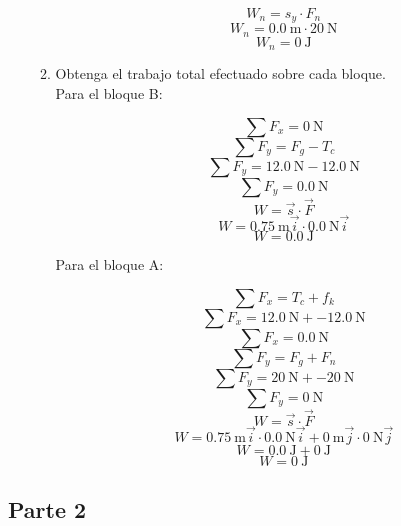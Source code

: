 \documentclass[Física - Práctica.root.tex]{subfiles}
\begin{document}
\begin{enumerate}
\begin{enumerate}
\begin{center}
                  \[ W_n = s_y\cdot F_n \]
                  \[ W_n = \SI{0,0}{\meter}\cdot\SI{20}{\newton} \]
                  \[ \boxed{W_n = \SI{0}{\joule}} \]
                \end{center}
          \item Obtenga el trabajo total efectuado sobre cada bloque. \\
                Para el bloque B:
                \begin{center}
                  \[ \sum F_x = \SI{0}{\newton} \]
                  \[ \sum F_y = F_g - T_c \]
                  \[ \sum F_y = \SI{12,0}{\newton} - \SI{12,0}{\newton} \]
                  \[ \sum F_y = \SI{0,0}{\newton} \]
                  \[ W = \vec{s}\cdot\vec{F} \]
                  \[ W = \SI{0,75}{\meter}\vec{i}\cdot\SI{0,0}{\newton}\vec{i} \]
                  \[ \boxed{W = \SI{0,0}{\joule}} \]
                \end{center}
                Para el bloque A:
                \begin{center}
                  \[ \sum F_x = T_c + f_k \]
                  \[ \sum F_x = \SI{12,0}{\newton} + \SI{-12,0}{\newton} \]
                  \[ \sum F_x = \SI{0,0}{\newton} \]
                  \[ \sum F_y = F_g + F_n \]
                  \[ \sum F_y = \SI{20}{\newton} + \SI{-20}{\newton} \]
                  \[ \sum F_y = \SI{0}{\newton} \]
                  \[ W = \vec{s}\cdot\vec{F} \]
                  \[ 
                      W = \SI{0,75}{\meter}\vec{i}\cdot\SI{0,0}{\newton}\vec{i}
                        + \SI{0}{\meter}\vec{j}\cdot\SI{0}{\newton}\vec{j}
                   \]
                  \[ 
                      W = \SI{0,0}{\joule}
                        + \SI{0}{\joule}
                   \]
                  \[ \boxed{W = \SI{0}{\joule}} \]
                \end{center}
        \end{enumerate}

\end{enumerate}

\subsection{Parte 2}
\begin{enumerate}

\end{enumerate}
\end{document}
